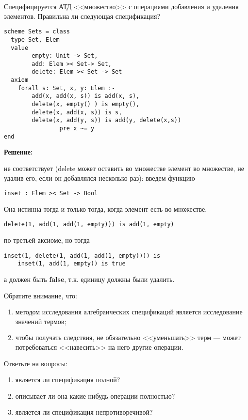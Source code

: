 

\z Специфицируется АТД <<множество>> с операциями добавления и удаления элементов. Правильна ли следующая спецификация?
\begin{lstlisting}
scheme Sets = class
  type Set, Elem
  value
        empty: Unit -> Set,
        add: Elem >< Set-> Set,
        delete: Elem >< Set -> Set
  axiom
    forall s: Set, x, y: Elem :-
        add(x, add(x, s)) is add(x, s),
        delete(x, empty() ) is empty(),
        delete(x, add(x, s)) is s,
        delete(x, add(y, s)) is add(y, delete(x,s))
                pre x ~= y
end
\end{lstlisting}

\textbf{Решение:}

не соответствует (delete может оставить во множестве элемент во множестве, не удалив его, если он добавлялся несколько раз): введем функцию
\begin{lstlisting}
inset : Elem >< Set -> Bool
\end{lstlisting}
Она истинна тогда и только тогда, когда элемент есть во множестве.
\begin{lstlisting}
delete(1, add(1, add(1, empty))) is add(1, empty)
\end{lstlisting} по третьей аксиоме, но тогда
\begin{lstlisting}
inset(1, delete(1, add(1, add(1, empty)))) is
    inset(1, add(1, empty)) is true
\end{lstlisting}
а должен быть \textbf{false}, т.к. единицу должны были удалить.

Обратите внимание, что:
\begin{enumerate}
  \item методом исследования алгебраических спецификаций является исследование значений термов;
  \item чтобы получать следствия, не обязательно <<уменьшать>> терм --- может потребоваться <<навесить>> на него другие операции.
\end{enumerate}

Ответьте на вопросы:
\begin{enumerate}
  \item является ли спецификация полной?
  \item описывает ли она какие-нибудь операции полностью?
  \item является ли спецификация непротиворечивой?
\end{enumerate}


